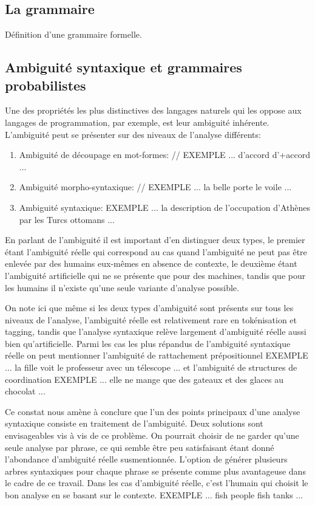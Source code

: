 \documentclass[12pt]{article}
\begin{document}
\subsection{La grammaire}

D\'efinition d'une grammaire formelle.

\subsection{Ambiguit\'e syntaxique et grammaires probabilistes}

Une des propri\'et\'es les plus distinctives des langages naturels qui les
oppose aux langages de programmation, par exemple, est leur ambiguit\'e inh\'erente. L'ambiguit\'e peut se pr\'esenter sur des niveaux de l'analyse diff\'erents:
\begin{enumerate}
\item Ambiguit\'e de d\'ecoupage en mot-formes:
//
EXEMPLE ... d'accord d'+accord ...
\item Ambiguit\'e morpho-syntaxique:
//
EXEMPLE ... la belle porte le voile ...
\item Ambiguit\'e syntaxique:
EXEMPLE ... la description de l'occupation d'Ath\`enes par les Turcs ottomans ... 
\end{enumerate}

En parlant de l'ambiguit\'e il est important d'en distinguer deux types, le
premier \'etant l'ambiguit\'e r\'eelle qui correspond au cas quand l'ambiguit\'e
ne peut pas \^etre enlev\'ee par des humains eux-m\^emes en absence de contexte,
le deuxi\`eme \'etant l'ambiguit\'e artificielle qui ne se pr\'esente que pour des machines, tandis que pour les humains il n'existe qu'une seule variante d'analyse possible.

On note ici que m\^eme si les deux types d'ambiguit\'e sont pr\'esents sur tous les niveaux de l'analyse, l'ambiguit\'e r\'eelle est relativement rare en tok\'enisation et tagging, tandis que l'analyse syntaxique
rel\`eve largement d'ambiguit\'e r\'eelle aussi bien qu'artificielle. Parmi les cas les plus r\'epandus de l'ambiguit\'e syntaxique r\'eelle on peut mentionner l'ambiguit\'e de rattachement pr\'epositionnel
EXEMPLE ... la fille voit le professeur avec un t\'elescope ... 
et l'ambiguit\'e de structures de coordination
EXEMPLE  ... elle ne mange que des gateaux et des glaces au chocolat  ... 

Ce constat nous am\`ene \`a conclure que l'un des points principaux d'une
analyse syntaxique consiste en traitement de l'ambiguit\'e. Deux solutions sont
envisageables vis \`a vis de ce probl\`eme. On pourrait choisir de ne garder
qu'une seule analyse par phrase, ce qui semble \^etre peu satisfaisant \'etant
donn\'e l'abondance d'ambiguit\'e r\'eelle susmentionn\'ee. L'option de
g\'en\'erer plusieurs arbres syntaxiques pour chaque phrase se pr\'esente comme
plus avantageuse dans le cadre de ce travail. Dans les cas d'ambiguit\'e
r\'eelle, c'est l'humain qui choisit le bon analyse en se basant sur le
contexte.
EXEMPLE ... fish people fish tanks ...
\end{document}
